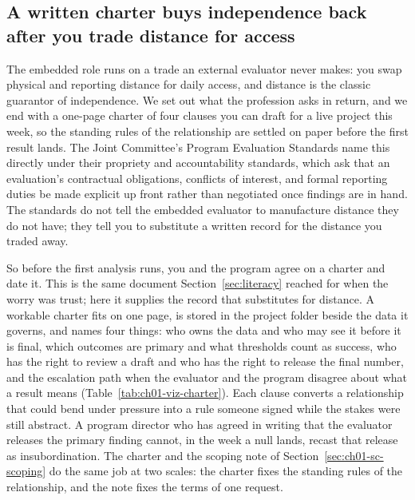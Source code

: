\documentclass[
    a4paper,
    fontsize=10pt,
    twoside=true,
    numbers=noenddot,
]{kaobook}
\begin{document}
\subsection{A written charter buys independence back after you trade distance for access}\label{sec:ch01-charter}
The embedded role runs on a trade an external evaluator never makes: you swap physical and reporting distance for daily access, and distance is the classic guarantor of independence. We set out what the profession asks in return, and we end with a one-page charter of four clauses you can draft for a live project this week, so the standing rules of the relationship are settled on paper before the first result lands. The Joint Committee's Program Evaluation Standards \parencite{yarbrough2011standards} name this directly under their propriety and accountability standards, which ask that an evaluation's contractual obligations, conflicts of interest, and formal reporting duties be made explicit up front rather than negotiated once findings are in hand. The standards do not tell the embedded evaluator to manufacture distance they do not have; they tell you to substitute a written record for the distance you traded away.

So before the first analysis runs, you and the program agree on a charter and date it. This is the same document Section~\ref{sec:literacy} reached for when the worry was trust; here it supplies the record that substitutes for distance. A workable charter fits on one page, is stored in the project folder beside the data it governs, and names four things: who owns the data and who may see it before it is final, which outcomes are primary and what thresholds count as success, who has the right to review a draft and who has the right to release the final number, and the escalation path when the evaluator and the program disagree about what a result means (Table~\ref{tab:ch01-viz-charter}). Each clause converts a relationship that could bend under pressure into a rule someone signed while the stakes were still abstract. A program director who has agreed in writing that the evaluator releases the primary finding cannot, in the week a null lands, recast that release as insubordination. The charter and the scoping note of Section~\ref{sec:ch01-sc-scoping} do the same job at two scales: the charter fixes the standing rules of the relationship, and the note fixes the terms of one request.
\end{document}
